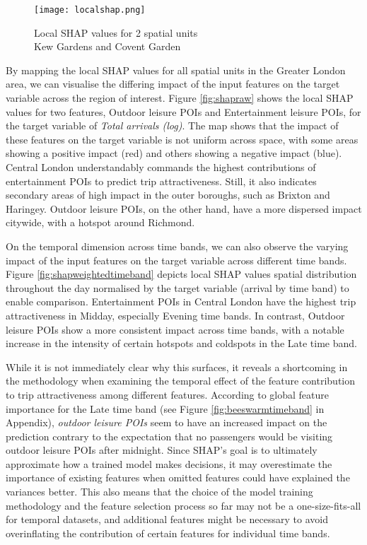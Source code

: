 \begin{figure}[!ht]
    \centering
    \texttt{[image: localshap.png]}
    \captionsetup{justification=centering}
    \caption{Local SHAP values for 2 spatial units\\Kew Gardens and Covent Garden}
    \label{fig:localshap}
\end{figure}

By mapping the local SHAP values for all spatial units in the Greater London area, we can visualise the differing impact of the input features on the target variable across the region of interest. Figure \ref{fig:shapraw} shows the local SHAP values for two features, Outdoor leisure POIs and Entertainment leisure POIs, for the target variable of \textit{Total arrivals (log)}. The map shows that the impact of these features on the target variable is not uniform across space, with some areas showing a positive impact (red) and others showing a negative impact (blue). Central London understandably commands the highest contributions of entertainment POIs to predict trip attractiveness. Still, it also indicates secondary areas of high impact in the outer boroughs, such as Brixton and Haringey. Outdoor leisure POIs, on the other hand, have a more dispersed impact citywide, with a hotspot around Richmond. 

On the temporal dimension across time bands, we can also observe the varying impact of the input features on the target variable across different time bands. Figure \ref{fig:shapweightedtimeband} depicts local SHAP values spatial distribution throughout the day normalised by the target variable (arrival by time band) to enable comparison. Entertainment POIs in Central London have the highest trip attractiveness in Midday, especially Evening time bands. In contrast, Outdoor leisure POIs show a more consistent impact across time bands, with a notable increase in the intensity of certain hotspots and coldspots in the Late time band. 

While it is not immediately clear why this surfaces, it reveals a shortcoming in the methodology when examining the temporal effect of the feature contribution to trip attractiveness among different features. According to global feature importance for the Late time band (see Figure \ref{fig:beeswarmtimeband} in Appendix), \textit{outdoor leisure POIs} seem to have an increased impact on the prediction contrary to the expectation that no passengers would be visiting outdoor leisure POIs after midnight. Since SHAP's goal is to ultimately approximate how a trained model makes decisions, it may overestimate the importance of existing features when omitted features could have explained the variances better. This also means that the choice of the model training methodology and the feature selection process so far may not be a one-size-fits-all for temporal datasets, and additional features might be necessary to avoid overinflating the contribution of certain features for individual time bands. 

